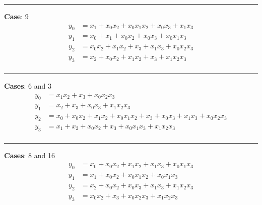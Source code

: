 \newpage
\begin{minipage}{.8\textwidth}

\hrule

\vspace{2em}
\noindent 
\textbf{Case}: 9 
\begin{align*}
y_0 & = x_1 + x_0x_2 + x_0x_1x_2 + x_0x_3 + x_1x_3 \\
y_1 & = x_0 + x_1 + x_0x_2 + x_0x_3 + x_0x_1x_3 \\
y_2 & = x_0x_2 + x_1x_2 + x_3 + x_1x_3 + x_0x_2x_3 \\
y_3 & = x_2 + x_0x_2 + x_1x_2 + x_3 + x_1x_2x_3 \\
\end{align*}
\vspace{-1em}
\hrule
\vspace{2em}
\noindent 

\textbf{Cases}: 6 and 3
\begin{align*}
y_0 & = x_1x_2 + x_3 + x_0x_2x_3 \\
y_1 & = x_2 + x_3 + x_0x_3 + x_1x_2x_3 \\
y_2 & = x_0 + x_0x_2 + x_1x_2 + x_0x_1x_2 + x_3 + x_0x_3 + x_1x_3 + x_0x_2x_3 \\
y_3 & = x_1 + x_2 + x_0x_2 + x_3 + x_0x_1x_3 + x_1x_2x_3 \\
\end{align*}
\vspace{-1em}


\hrule
\vspace{2em}
\noindent 

\textbf{Cases}: 8 and 16
\begin{align*}
y_0 & = x_0 + x_0x_2 + x_1x_2 + x_1x_3 + x_0x_1x_3 \\
y_1 & = x_1 + x_0x_2 + x_0x_1x_2 + x_0x_1x_3 \\
y_2 & = x_2 + x_0x_2 + x_0x_3 + x_1x_3 + x_1x_2x_3 \\
y_3 & = x_0x_2 + x_3 + x_0x_2x_3 + x_1x_2x_3 \\
\end{align*}
\vspace{-1em}



\end{minipage}
